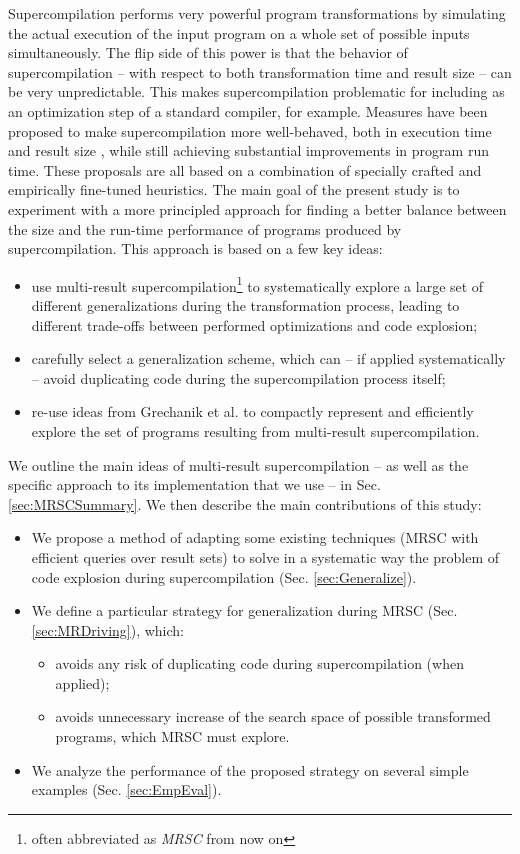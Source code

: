 \documentclass[submission,copyright,creativecommons]{eptcs}
\begin{document}
Supercompilation performs very powerful program transformations by simulating
the actual execution of the input program on a whole set of possible inputs
simultaneously.
The flip side of this power is that the behavior of supercompilation -- 
with respect to both transformation time and result size --
can be very unpredictable.
This makes supercompilation problematic for including as an
optimization step of a standard compiler, for example.
Measures have been proposed to make supercompilation more
well-behaved, both in execution time and result size \cite{bolingbroke2011improving,Jonsson2011Taming},
while still achieving substantial improvements in program run time.
These proposals are all based on a combination of specially crafted and
empirically fine-tuned heuristics.
The main goal of the present study is to experiment with a more
principled approach for finding a better balance between the size and the
run-time performance of programs produced by supercompilation.
This approach is based on a few key ideas:
\begin{itemize}
  \item use multi-result supercompilation\footnote{often abbreviated as \emph{MRSC} from now on} 
    \cite{KlyuchnikovMRSCBranch,Klyuchnikov:META2012:MRSC,Romanenko2014StagedMRSC}
    to systematically explore a large set of different generalizations during 
    the transformation process, 
    leading to different trade-offs between performed optimizations and code explosion;
  \item carefully select a generalization scheme, which can -- if applied systematically -- avoid duplicating
    code during the supercompilation process itself;
  \item re-use ideas from Grechanik et al. \cite{Romanenko2014StagedMRSC} to compactly represent and efficiently
    explore the set of programs resulting from multi-result supercompilation.
\end{itemize}
We outline the main ideas of multi-result supercompilation --
as well as the specific approach to its implementation that we use --
in Sec. \ref{sec:MRSCSummary}. We then describe the main contributions of this study:
\begin{itemize}
  \item We propose a method of adapting some existing techniques (MRSC with
    efficient queries over result sets)
    to solve in a systematic way the problem of code explosion during supercompilation (Sec. \ref{sec:Generalize}).
  \item We define a particular strategy for generalization during MRSC (Sec. \ref{sec:MRDriving}), which:
    \begin{itemize}
      \item avoids any risk of duplicating code during supercompilation (when applied);
      \item avoids unnecessary increase of the search space of possible
        transformed programs, which MRSC must explore.
    \end{itemize}
  \item We analyze the performance of the proposed strategy on several
    simple examples (Sec. \ref{sec:EmpEval}).
\end{itemize}
\end{document}
